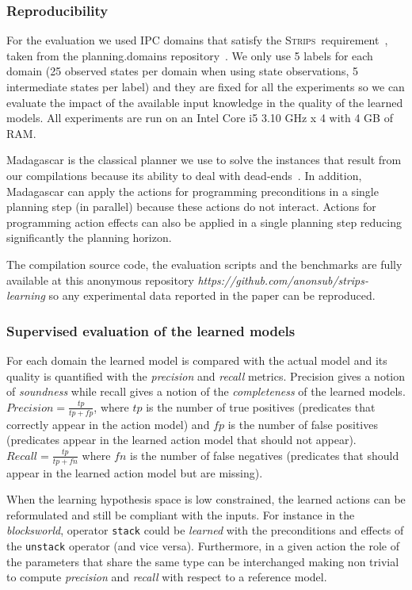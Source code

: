 \documentclass{article}
\newcommand{\strips}{\textsc{Strips}}     %
\begin{document}
\subsubsection{Reproducibility}
For the evaluation we used IPC domains that satisfy the \strips\ requirement~\cite{fox2003pddl2}, taken from the {\sc planning.domains} repository~\cite{muise2016planning}. We only use 5 labels for each domain (25 observed states per domain when using state observations, 5 intermediate states per label) and they are fixed for all the experiments so we can evaluate the impact of the available input knowledge in the quality of the learned models. All experiments are run on an Intel Core i5 3.10 GHz x 4 with 4 GB of RAM.

{\sc Madagascar} is the classical planner we use to solve the instances that result from our compilations because its ability to deal with dead-ends~\cite{rintanen2014madagascar}. In addition, {\sc Madagascar} can apply the actions for programming preconditions in a single planning step (in parallel) because these actions do not interact. Actions for programming action effects can also be applied in a single planning step reducing significantly the planning horizon.

The compilation source code, the evaluation scripts and the benchmarks are fully available at this anonymous repository {\em https://github.com/anonsub/strips-learning} so any experimental data reported in the paper can be reproduced. 

\subsubsection{Supervised evaluation of the learned models}
For each domain the learned model is compared with the actual model and its quality is quantified with the {\em precision} and {\em recall} metrics. Precision gives a notion of {\em soundness} while recall gives a notion of the {\em completeness} of the learned models. $Precision=\frac{tp}{tp+fp}$, where $tp$ is the number of true positives (predicates that correctly appear in the action model) and $fp$ is the number of false positives (predicates appear in the learned action model that should not appear). $Recall=\frac{tp}{tp+fn}$ where $fn$ is the number of false negatives (predicates that should appear in the learned action model but are missing).

When the learning hypothesis space is low constrained, the learned actions can be reformulated and still be compliant with the inputs. For instance in the {\em blocksworld}, operator {\small\tt stack} could be {\em learned} with the preconditions and effects of the {\small\tt unstack} operator (and vice versa). Furthermore, in a given action the role of the parameters that share the same type can be interchanged making non trivial to compute {\em precision} and {\em recall} with respect to a reference model.
\end{document}
